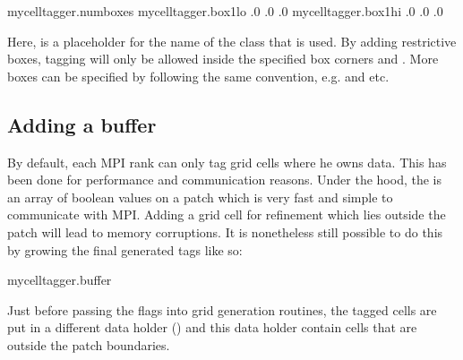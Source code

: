 \documentclass[letterpaper,10pt,english]{sphinxmanual}
\begin{document}
\begin{sphinxVerbatim}[commandchars=\\\{\},formatcom=\scriptsize]
my\PYGZus{}cell\PYGZus{}tagger.num\PYGZus{}boxes                
my\PYGZus{}cell\PYGZus{}tagger.box1\PYGZus{}lo      .0 .0 .0  
my\PYGZus{}cell\PYGZus{}tagger.box1\PYGZus{}hi      .0 .0 .0  
\end{sphinxVerbatim}

Here,  is a placeholder for the name of the class that is used.
By adding restrictive boxes, tagging will only be allowed inside the specified box corners  and .
More boxes can be specified by following the same convention, e.g.  and  etc.


\subsection{Adding a buffer}
\label{\detokenize{CellTagger:adding-a-buffer}}
By default, each MPI rank can only tag grid cells where he owns data.
This has been done for performance and communication reasons.
Under the hood, the  is an array of boolean values on a patch which is very fast and simple to communicate with MPI.
Adding a grid cell for refinement which lies outside the patch will lead to memory corruptions.
It is nonetheless still possible to do this by growing the final generated tags like so:

\begin{sphinxVerbatim}[commandchars=\\\{\},formatcom=\scriptsize]
my\PYGZus{}cell\PYGZus{}tagger.buffer   
\end{sphinxVerbatim}

Just before passing the flags into  grid generation routines, the tagged cells are put in a different data holder () and this data holder  contain cells that are outside the patch boundaries.
\end{document}
